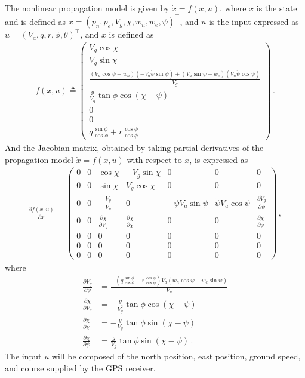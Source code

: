 The nonlinear propagation model is given by $\dot{x}=f(x,u)$, where $x$ is the state and is defined as $x=(p_n,p_e,V_g,\chi,w_n,w_e,\psi)^\top$, and $u$ is the input expressed as $u=(V_a,q,r,\phi,\theta)^\top$, and $\dot{x}$ is defined as
\begin{align}
f(x,u) \triangleq 
\begin{pmatrix}
V_g\cos\chi \\
V_g\sin\chi \\
\frac{(V_a\cos\psi+w_n)(-V_a\dot{\psi}\sin\psi)+(V_a\sin\psi+w_e)(V_a\dot{\psi}\cos\psi)}{V_g} \\
\frac{g}{V_g}\tan\phi\cos(\chi-\psi) \\
0 \\
0 \\
q\frac{\sin\phi}{\cos\phi}+r\frac{\cos\phi}{\cos\phi}
\end{pmatrix}\,.
\end{align}
And the Jacobian matrix, obtained by taking partial derivatives of the propagation model $\dot{x}=f(x,u)$ with respect to $x$, is expressed as
\begin{align}
\frac{\partial f(x,u)}{\partial x}=
\begin{pmatrix}
0 & 0 & \cos\chi & -V_g\sin\chi & 0 & 0 & 0 \\
0 & 0 & \sin\chi & V_g\cos\chi  & 0 & 0 & 0 \\
0 & 0 & -\frac{\dot{V}_g}{V_g} & 0 & -\dot{\psi}V_a\sin\psi & \dot{\psi}V_a\cos\psi & \frac{\partial \dot{V}_g}{\partial \psi} \\
0 & 0 & \frac{\partial \dot{\chi}}{\partial V_g} & \frac{\partial \dot{\chi}}{\partial \chi} & 0 & 0 & \frac{\partial \dot{\chi}}{\partial \psi} \\
0 & 0 & 0& 0 & 0 & 0 & 0 \\
0 & 0 & 0& 0 & 0 & 0 & 0 \\
0 & 0 & 0& 0 & 0 & 0 & 0
\end{pmatrix}\,,
\end{align}
where
\begin{align*}
\frac{\partial\dot{V}_g}{\partial\psi}&= \frac{-\left(q\frac{\sin\phi}{\cos\phi}+r\frac{\cos\phi}{\cos\phi}\right)V_a(w_n\cos\psi+w_e\sin\psi)}{V_g} \\
\frac{\partial\dot{\chi}}{\partial V_g}&= -\frac{g}{V_g^2}\tan\phi\cos(\chi-\psi) \\
\frac{\partial\dot{\chi}}{\partial\chi} &= -\frac{g}{V_g}\tan\phi\sin(\chi-\psi) \\
\frac{\partial\chi}{\partial\psi} &= \frac{g}{V_g}\tan\phi\sin(\chi-\psi)\,.
\end{align*}
The input $u$ will be composed of the north position, east position, ground speed, and course supplied by the GPS receiver. 

